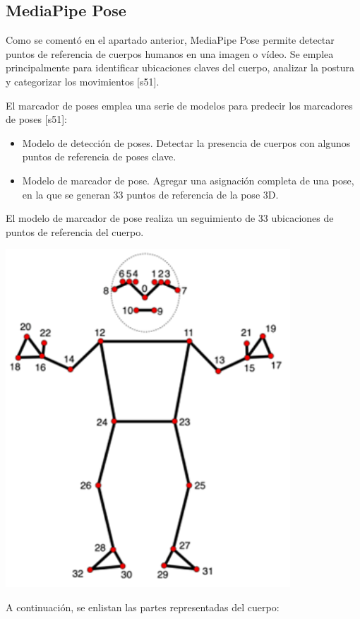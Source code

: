 \subsection{MediaPipe Pose}
Como se comentó en el apartado anterior, MediaPipe Pose permite detectar puntos de referencia de cuerpos humanos en una imagen o vídeo. Se emplea principalmente para identificar ubicaciones claves del cuerpo, analizar la postura y categorizar los movimientos [s51].

El marcador de poses emplea una serie de modelos para predecir los marcadores de poses [s51]:
\begin{itemize}

    \item Modelo de detección de poses. Detectar la presencia de cuerpos con algunos puntos de referencia de poses clave.
    \item Modelo de marcador de pose. Agregar una asignación completa de una pose, en la que se generan 33 puntos de referencia de la pose 3D.

\end{itemize}
El modelo de marcador de pose realiza un seguimiento de 33 ubicaciones de puntos de referencia del cuerpo.
\begin{center}
    \includegraphics[width=0.8\textwidth]{Images/human.png}
\end{center}
A continuación, se enlistan las partes representadas del cuerpo:

